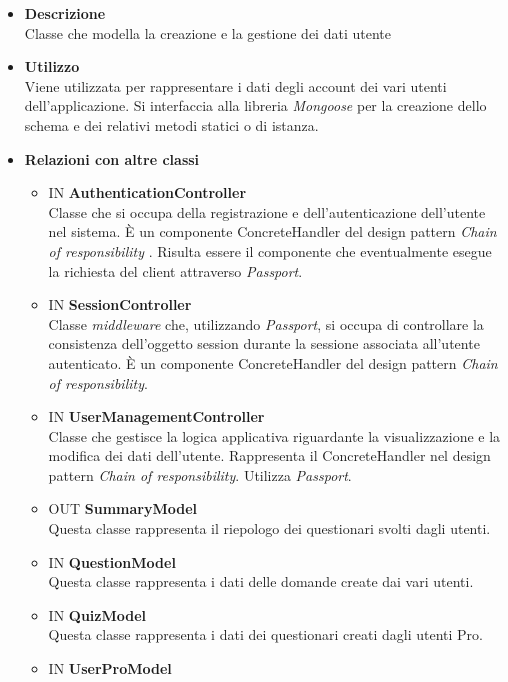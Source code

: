 \begin{itemize}
	\item \textbf{Descrizione} \\
	Classe che modella la creazione e la gestione dei dati utente
	\item \textbf{Utilizzo} \\
	Viene utilizzata per rappresentare i dati degli account dei vari utenti dell'applicazione. Si interfaccia alla libreria \textit{Mongoose} per la creazione dello schema e dei relativi metodi statici o di istanza.
	\item \textbf{Relazioni con altre classi} 
		\begin{itemize}
			\item IN \textbf {AuthenticationController} \\
			Classe che si occupa della registrazione e dell'autenticazione dell'utente nel sistema. È un componente ConcreteHandler del design pattern \textit{Chain of responsibility} . Risulta essere il componente che eventualmente esegue la richiesta del client attraverso \textit{Passport}.
			\item IN \textbf {SessionController} \\
			Classe \textit{middleware} che, utilizzando \textit{Passport}, si occupa di controllare la consistenza dell'oggetto session durante la sessione associata all’utente autenticato. È un componente ConcreteHandler del design pattern \textit{Chain of responsibility}.	
			\item IN \textbf {UserManagementController} \\
			Classe che gestisce la logica applicativa riguardante la visualizzazione e la modifica dei dati dell'utente.
Rappresenta il ConcreteHandler nel design pattern \textit{Chain of responsibility}. Utilizza \textit{Passport}.
			\item OUT \textbf{SummaryModel} \\
			Questa classe rappresenta il riepologo dei questionari svolti dagli utenti.
			\item IN \textbf{QuestionModel} \\
			Questa classe rappresenta i dati delle domande create dai vari utenti.
			\item IN \textbf{QuizModel} \\
			Questa classe rappresenta i dati dei questionari creati dagli utenti Pro.
			\item IN \textbf{UserProModel} \\

\end{itemize}
\end{itemize}
